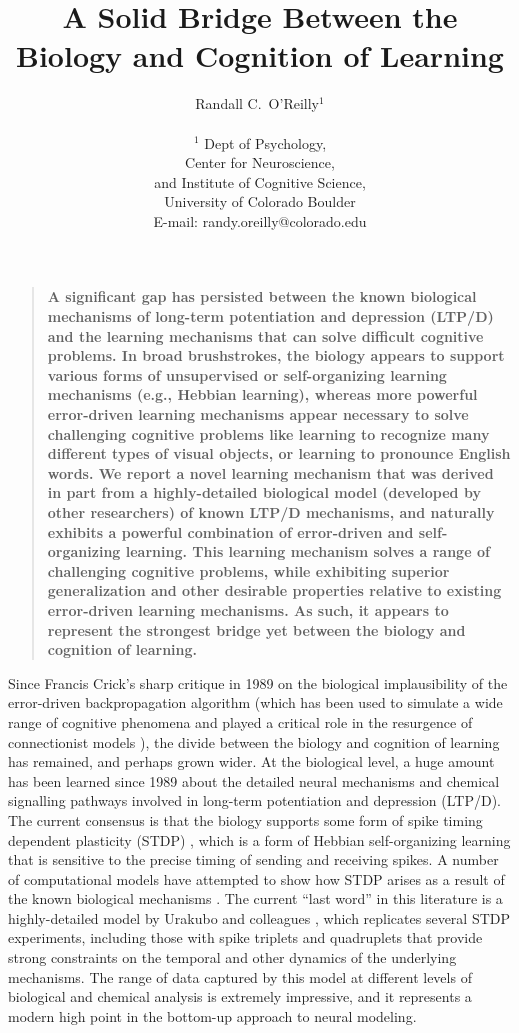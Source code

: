\documentclass[11pt,twoside]{article}
\title{A Solid Bridge Between the Biology and Cognition of Learning }
\author{
Randall C.\ O'Reilly$^{1}$ \\ 
\\
\normalsize{$^{1}$ Dept of Psychology,\\ Center for Neuroscience,\\ and Institute
  of Cognitive Science,\\
  University of Colorado Boulder\\
  E-mail: randy.oreilly@colorado.edu}
}
\date{}
\newenvironment{sciabstract}{%
\begin{quote} \bf}
{\end{quote}}
\begin{document}
%

\sloppy
\raggedbottom
\baselineskip20pt

\maketitle

\begin{sciabstract}
  A significant gap has persisted between the known biological mechanisms of
  long-term potentiation and depression (LTP/D) and the learning mechanisms
  that can solve difficult cognitive problems.  In broad brushstrokes, the
  biology appears to support various forms of unsupervised or self-organizing
  learning mechanisms (e.g., Hebbian learning), whereas more powerful
  error-driven learning mechanisms appear necessary to solve challenging
  cognitive problems like learning to recognize many different types of visual
  objects, or learning to pronounce English words.  We report a novel learning
  mechanism that was derived in part from a highly-detailed biological model
  (developed by other researchers) of known LTP/D mechanisms, and naturally
  exhibits a powerful combination of error-driven and self-organizing
  learning.  This learning mechanism solves a range of challenging cognitive
  problems, while exhibiting superior generalization and other desirable
  properties relative to existing error-driven learning mechanisms.  As such,
  it appears to represent the strongest bridge yet between the biology and
  cognition of learning.
\end{sciabstract}

\pagestyle{myheadings}

Since Francis Crick's sharp critique \cite{Crick89} in 1989 on the biological
implausibility of the error-driven backpropagation algorithm
\cite{RumelhartHintonWilliams86b} (which has been used to simulate a wide
range of cognitive phenomena and played a critical role in the resurgence of
connectionist models \cite{RumelhartMcClelland86}), the divide between the
biology and cognition of learning has remained, and perhaps grown wider.  At
the biological level, a huge amount has been learned since 1989 about the
detailed neural mechanisms and chemical signalling pathways involved in
long-term potentiation and depression (LTP/D).  The current consensus is that
the biology supports some form of spike timing dependent plasticity (STDP)
\cite{stdp_refs}, which is a form of Hebbian self-organizing learning that is
sensitive to the precise timing of sending and receiving spikes.  A number of
computational models have attempted to show how STDP arises as a result of the
known biological mechanisms \cite{stdp_models}.  The current ``last word'' in
this literature is a highly-detailed model by Urakubo and colleagues
\cite{Urakubo}, which replicates several STDP experiments, including those
with spike triplets and quadruplets that provide strong constraints on the
temporal and other dynamics of the underlying mechanisms.  The range of data
captured by this model at different levels of biological and chemical analysis
is extremely impressive, and it represents a modern high point in the
bottom-up approach to neural modeling.
\end{document}
